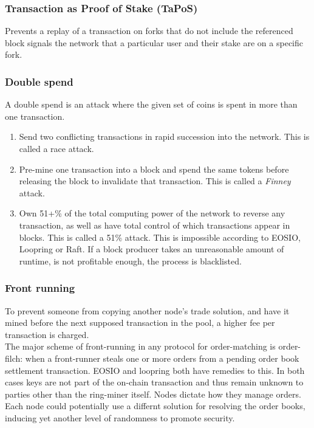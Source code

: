 \documentclass[]{article}
\begin{document}
		\subsubsection{Transaction as Proof of Stake (TaPoS)}
			Prevents a replay of a transaction on forks that do not include the referenced block signals the network that a particular user and their stake are on a specific fork.
		\subsubsection{Double spend}
		A double spend is an attack where the given set of coins is spent in more than one transaction.
		\begin{enumerate}
			\item Send two conflicting transactions in rapid succession into the network. This is called a race attack. 
			\item Pre-mine one transaction into a block and spend the same tokens before releasing the block to invalidate that transaction. This is called a \textit{Finney} attack.
			\item Own 51+\% of the total computing power of the network to reverse any transaction, as well as have total control of which transactions appear in blocks. This is called a 51\% attack.
			This is impossible according to EOSIO, Loopring or Raft.
			If a block producer takes an unreasonable amount of runtime, is not profitable enough, the process is blacklisted.
		\end{enumerate} 

		\subsubsection{Front running}
		To prevent someone from copying another node's trade solution, 
		and have it mined before the next supposed transaction in the pool, 
		a higher fee per transaction is charged.\\ 
		The major scheme of front-running in any protocol for
		order-matching is order-filch: when a front-runner steals
		one or more orders from a pending order book settlement
		transaction. EOSIO and loopring both have remedies to this.
		In both cases keys are not part of the on-chain transaction and thus remain unknown
		to parties other than the ring-miner itself.
		Nodes dictate how they manage orders.
		Each node could potentially use a differnt solution for resolving
		the order books, inducing yet another level of randomness to promote security.
			
\end{document}
